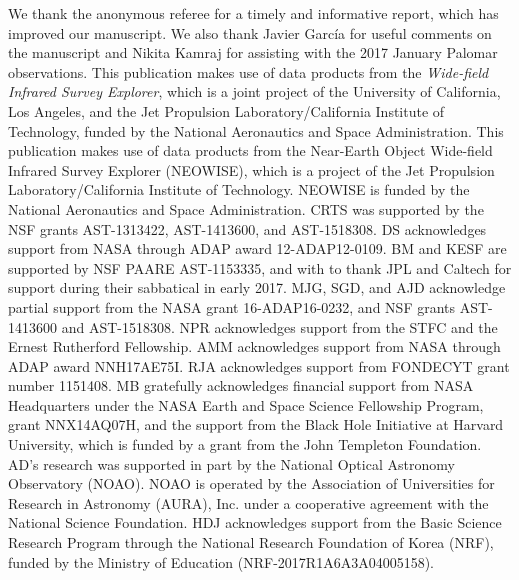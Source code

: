\documentclass[iop]{emulateapj}
\begin{document}
\acknowledgements

We thank the anonymous referee for a timely and informative
report, which has improved our manuscript.  We also thank Javier
Garc{\'i}a for useful comments on the manuscript and Nikita Kamraj
for assisting with the 2017 January Palomar observations.  This
publication makes use of data products from the {\it Wide-field
Infrared Survey Explorer}, which is a joint project of the University
of California, Los Angeles, and the Jet Propulsion Laboratory/California
Institute of Technology, funded by the National Aeronautics and
Space Administration.  This publication makes use of data products
from the Near-Earth Object Wide-field Infrared Survey Explorer
(NEOWISE), which is a project of the Jet Propulsion Laboratory/California
Institute of Technology. NEOWISE is funded by the National Aeronautics
and Space Administration.  CRTS was supported by the NSF grants
AST-1313422, AST-1413600, and AST-1518308.  DS acknowledges support
from NASA through ADAP award 12-ADAP12-0109.  BM and KESF are
supported by NSF PAARE AST-1153335, and with to thank JPL and Caltech
for support during their sabbatical in early 2017.  MJG, SGD, and
AJD acknowledge partial support from the NASA grant 16-ADAP16-0232,
and NSF grants AST-1413600 and AST-1518308.
NPR acknowledges support from the STFC and the Ernest Rutherford
Fellowship.  AMM acknowledges support from NASA through ADAP award
NNH17AE75I.  RJA acknowledges support from FONDECYT grant number
1151408.  MB gratefully acknowledges financial support from NASA
Headquarters under the NASA Earth and Space Science Fellowship
Program, grant NNX14AQ07H, and the support from the Black Hole
Initiative at Harvard University, which is funded by a grant from
the John Templeton Foundation.  AD's research was supported in part
by the National Optical Astronomy Observatory (NOAO). NOAO is
operated by the Association of Universities for Research in Astronomy
(AURA), Inc.  under a cooperative agreement with the National Science
Foundation.  HDJ acknowledges support from the Basic Science Research
Program through the National Research Foundation of Korea (NRF),
funded by the Ministry of Education (NRF-2017R1A6A3A04005158).


\end{document}
